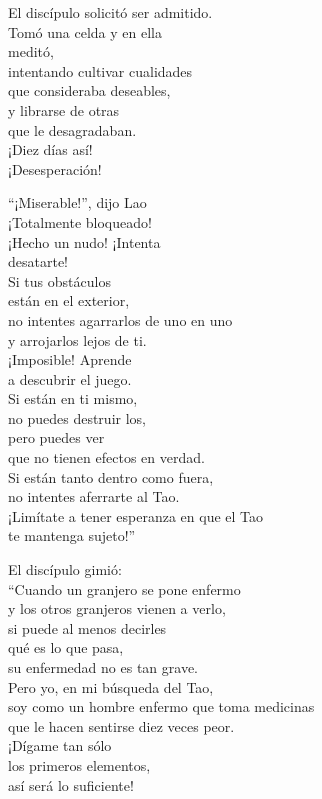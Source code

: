 \documentclass[book,b5paper,hidelinks,final]{memoir}
\begin{document}
	El discípulo solicitó ser admitido.\\
	Tomó una celda y en ella\\
	meditó,\\
	intentando cultivar cualidades\\
	que consideraba deseables,\\
	y librarse de otras\\
	que le desagradaban.\\
	¡Diez días así!\\
	¡Desesperación!
	
	``¡Miserable!'', dijo Lao\\
	¡Totalmente bloqueado!\\
	¡Hecho un nudo! ¡Intenta\\
	desatarte!\\
	Si tus obstáculos\\
	están en el exterior,\\
	no intentes agarrarlos de uno en uno\\
	y arrojarlos lejos de ti.\\
	¡Imposible! Aprende\\
	a descubrir el juego.\\
	Si están en ti mismo,\\
	no puedes destruir los,\\
	pero puedes ver\\
	que no tienen efectos en verdad.\\
	Si están tanto dentro como fuera,\\
	no intentes aferrarte al Tao.\\
	¡Limítate a tener esperanza en que el Tao\\
	te mantenga sujeto!''
	
	El discípulo gimió:\\
	``Cuando un granjero se pone enfermo\\
	y los otros granjeros vienen a verlo,\\
	si puede al menos decirles\\
	qué es lo que pasa,\\
	su enfermedad no es tan grave.\\
	Pero yo, en mi búsqueda del Tao,\\
	soy como un hombre enfermo que toma medicinas\\
	que le hacen sentirse diez veces peor.\\
	¡Dígame tan sólo\\
	los primeros elementos,\\
	así será lo suficiente!
	
\end{document}
